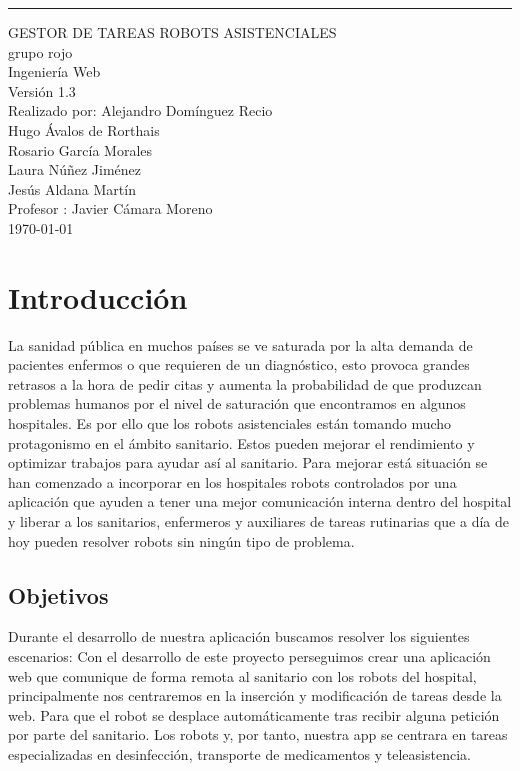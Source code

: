 \documentclass{scrreprt}
\date{}
\def\myversion{1.3}
\begin{document}
\begin{center}
    \rule{16cm}{5pt}\vskip1cm
    \begin{bfseries}
        \Huge{GESTOR DE TAREAS ROBOTS ASISTENCIALES}\\
        \vspace{1.5 cm}
        grupo rojo\\
        \vspace{1.5 cm}
        Ingeniería Web\\
        \vspace{1.5 cm}
        \LARGE{Versión \myversion}\\
        \vspace{1 cm}
        Realizado por: Alejandro Domínguez Recio \\
        Hugo Ávalos de Rorthais \\
        Rosario García Morales\\
        Laura Núñez Jiménez\\
        Jesús Aldana Martín \\
        \vspace{1 cm}
        Profesor : Javier Cámara Moreno\\
        \vspace{1 cm}
        \today\\
    \end{bfseries}
\end{center}

\tableofcontents

\chapter{Introducción}
La sanidad pública en muchos países se ve saturada por la alta demanda de pacientes enfermos o que requieren de un diagnóstico, esto provoca grandes retrasos a la hora de pedir citas y aumenta la probabilidad de que produzcan problemas humanos por el nivel de saturación que encontramos en algunos hospitales. Es por ello que los robots asistenciales están tomando mucho protagonismo en el ámbito sanitario. Estos pueden mejorar el rendimiento y optimizar trabajos para ayudar así al sanitario. Para mejorar está situación se han comenzado a incorporar en los hospitales robots controlados por una aplicación que ayuden a tener una mejor comunicación interna dentro del hospital y liberar a los sanitarios, enfermeros y auxiliares de tareas rutinarias que a día de hoy pueden resolver robots sin ningún tipo de problema. 

\section{Objetivos}
Durante el desarrollo de nuestra aplicación buscamos resolver los siguientes escenarios:
Con el desarrollo de este proyecto perseguimos crear una aplicación web que comunique de forma remota al sanitario con los robots del hospital, principalmente nos centraremos en la inserción y modificación de tareas desde la web. Para que el robot se desplace automáticamente tras recibir alguna petición por parte del sanitario. Los robots y, por tanto, nuestra app se centrara en tareas especializadas en desinfección, transporte de medicamentos y teleasistencia.
\end{document}
